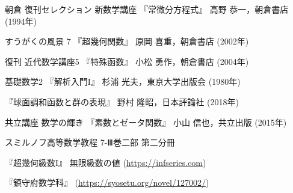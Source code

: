 \documentclass[a4paper,draft]{ltjsarticle}
\begin{document}
\begin{thebibliography}{9}\label{sec:参考文献}
     朝倉 復刊セレクション 新数学講座 『常微分方程式』 高野 恭一，朝倉書店 (1994年)

     すうがくの風景 7 『超幾何関数』 原岡 喜重，朝倉書店 (2002年)

     復刊 近代数学講座5 『特殊函数』 小松 勇作，朝倉書店 (2004年)

     基礎数学2 『解析入門I』 杉浦 光夫，東京大学出版会 (1980年)

     『球面調和函数と群の表現』 野村 隆昭，日本評論社 (2018年)

     共立講座 数学の輝き 『素数とゼータ関数』 小山 信也，共立出版 (2015年)

     スミルノフ高等数学教程 7-Ⅲ巻二部 第二分冊

     『超幾何級数I』 無限級数の値 (\url{https://infseries.com})

     『鎮守府数学科』 (\url{https://syosetu.org/novel/127002/})
\end{thebibliography}
\end{document}
